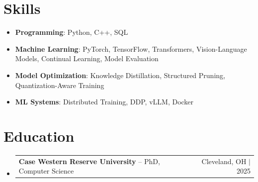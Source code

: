 \documentclass[letterpaper,13pt]{article}
\makeatletter
\newcommand{\resumeProjectHeading}[2]{
    \item
    \begin{tabular*}{\textwidth}{l@{\extracolsep{\fill}}r}
      \small#1 & #2 \\
    \end{tabular*}\vspace{-4pt}
}
\newcommand{\resumeSubHeadingListStart}{\begin{itemize}[leftmargin=0in, label={}]}
\newcommand{\resumeSubHeadingListEnd}{\end{itemize}}
\makeatother
\begin{document}
\section{Skills}
\vspace{0.02cm}
\begin{itemize}[leftmargin=0.15in, label={}, itemsep=2pt, topsep=1pt]
  \item \textbf{Programming}: Python, C++, SQL
  \item \textbf{Machine Learning}: PyTorch, TensorFlow, Transformers, Vision-Language Models, Continual Learning, Model Evaluation
  \item \textbf{Model Optimization}: Knowledge Distillation, Structured Pruning, Quantization-Aware Training
  \item \textbf{ML Systems}: Distributed Training, DDP, vLLM, Docker
\end{itemize}
\vspace{0.02cm}

\section{Education}
\resumeSubHeadingListStart
  \resumeProjectHeading{\textbf{Case Western Reserve University} -- PhD, Computer Science}{Cleveland, OH $|$ 2025}
\resumeSubHeadingListEnd
\end{document}
